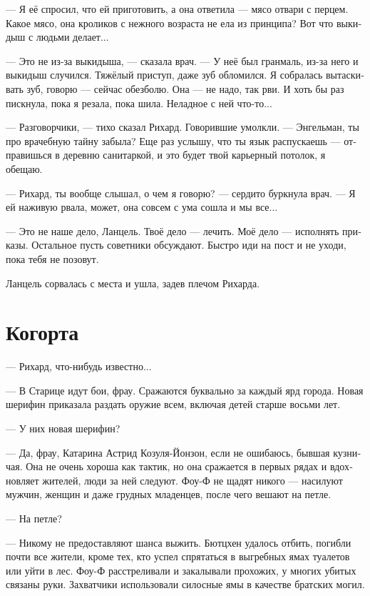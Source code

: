 \documentclass[a4paper,12pt,fleqn]{book}\usepackage{cooltooltips}\usepackage{polyglossia}\setdefaultlanguage[babelshorthands=true]{russian}\setotherlanguage{english}\defaultfontfeatures{Ligatures=TeX,Mapping=tex-text} \usepackage{xcolor}\definecolor{lightgray}{HTML}{bbbbbb}\color{lightgray}\newcommand{\ml}[3]{\textenglish{\textcolor{black}{#3}}}
\begin{document}
--- Я её спросил, что ей приготовить, а она ответила --- мясо отвари с перцем.
Какое мясо, она кроликов с нежного возраста не ела из принципа?
Вот что выкидыш с людьми делает...

--- Это не из-за выкидыша, --- сказала врач.
--- У неё был гранмаль, из-за него и выкидыш случился.
Тяжёлый приступ, даже зуб обломился.
Я собралась вытаскивать зуб, говорю --- сейчас обезболю.
Она --- не надо, так рви.
И хоть бы раз пискнула, пока я резала, пока шила.
Неладное с ней что-то...

--- Разговорчики, --- тихо сказал Рихард.
Говорившие умолкли.
--- Энгельман, ты про врачебную тайну забыла?
Еще раз услышу, что ты язык распускаешь --- отправишься в деревню санитаркой, и это будет твой карьерный потолок, я обещаю.

--- Рихард, ты вообще слышал, о чем я говорю? --- сердито буркнула врач.
--- Я ей наживую рвала, может, она совсем с ума сошла и мы все...

--- Это не наше дело, Ланцель.
Твоё дело --- лечить.
Моё дело --- исполнять приказы.
Остальное пусть советники обсуждают.
Быстро иди на пост и не уходи, пока тебя не позовут.

Ланцель сорвалась с места и ушла, задев плечом Рихарда.

\section{Когорта}

--- Рихард, что-нибудь известно...

--- В Старице идут бои, фрау.
Сражаются буквально за каждый ярд города.
Новая шерифин приказала раздать оружие всем, включая детей старше восьми лет.

--- У них новая шерифин?

--- Да, фрау, Катарина Астрид Козуля-Йонзон, если не ошибаюсь, бывшая кузничая.
Она не очень хороша как тактик, но она сражается в первых рядах и вдохновляет жителей, люди за ней следуют.
Фоу-Ф не щадят никого --- насилуют мужчин, женщин и даже грудных младенцев, после чего вешают на петле.

--- На петле?

--- Никому не предоставляют шанса выжить.
Бютцхен удалось отбить, погибли почти все жители, кроме тех, кто успел спрятаться в выгребных ямах туалетов или уйти в лес. %
Фоу-Ф расстреливали и закалывали прохожих, у многих убитых связаны руки.
Захватчики использовали силосные ямы в качестве братских могил.
\end{document}
